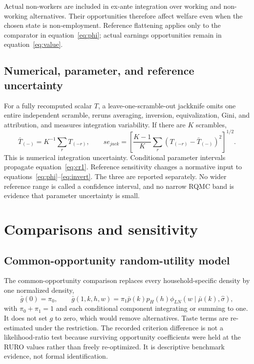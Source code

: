 \documentclass[11pt,a4paper]{article}
\begin{document}
Actual non-workers are included in ex-ante integration over working and
non-working alternatives. Their opportunities therefore affect welfare even
when the chosen state is non-employment. Reference flattening applies only to
the comparator in equation~\eqref{eq:phi}; actual earnings opportunities remain
in equation~\eqref{eq:value}.

\subsection{Numerical, parameter, and reference uncertainty}

For a fully recomputed scalar $T$, a leave-one-scramble-out jackknife omits one
entire independent scramble, reruns averaging, inversion, equivalization, Gini,
and attribution, and measures integration variability. If there are $K$
scrambles,
\begin{equation}
\bar T_{(-)}=K^{-1}\sum_rT_{(-r)},\qquad
se_{jack}=\left[\frac{K-1}{K}\sum_r(T_{(-r)}-\bar T_{(-)})^2\right]^{1/2}.
\end{equation}
This is numerical integration uncertainty. Conditional parameter intervals
propagate equation~\eqref{eq:cr1}. Reference sensitivity changes a normative
input to equations~\eqref{eq:phi}--\eqref{eq:invert}. The three are reported
separately. No wider reference range is called a confidence interval, and no
narrow RQMC band is evidence that parameter uncertainty is small.

\section{Comparisons and sensitivity}

\subsection{Common-opportunity random-utility model}

The common-opportunity comparison replaces every household-specific density by
one normalized density,
\begin{equation}
\bar g(0)=\pi_0,\qquad
\bar g(1,k,h,w)=\pi_1\bar p(k)p_H(h)
\phi_{LN}(w\mid\bar\mu(k),\widehat\sigma),
\end{equation}
with $\pi_0+\pi_1=1$ and each conditional component integrating or summing to
one. It does not set $g$ to zero, which would remove alternatives. Taste terms
are re-estimated under the restriction. The recorded criterion difference is
not a likelihood-ratio test because surviving opportunity coefficients were
held at the RURO values rather than freely re-optimized. It is descriptive
benchmark evidence, not formal identification.
\end{document}
